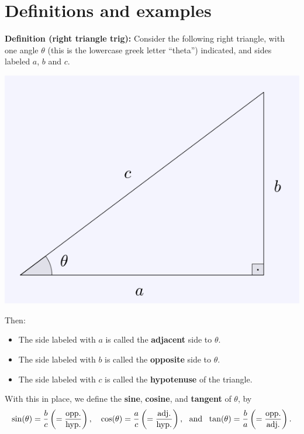 \documentclass{ximera}
\begin{document}
\section{Definitions and examples}

\begin{callout}
  {\bf Definition (right triangle trig):} Consider the following right triangle, with one angle $\theta$ (this is the lowercase greek letter ``theta'') indicated, and sides labeled $a$, $b$ and $c$.

\begin{center}
  \includegraphics[scale=.3]{./figures/9-1-1-defn.png}
\end{center}
  
  Then:
  \begin{itemize}
  \item   The side labeled with $a$ is called the {\bf adjacent} side to $\theta$.
  \item The side labeled with $b$ is called the {\bf opposite} side to $\theta$.
  \item   The side labeled with $c$ is called the {\bf hypotenuse} of the triangle.
  \end{itemize}
  With this in place, we define the {\bf sine}, {\bf cosine}, and {\bf tangent} of $\theta$, by $$\sin(\theta) = \frac{b}{c} \left(= \frac{\rm opp.}{\rm hyp.}\right), \quad \cos(\theta) = \frac{a}{c}\left(=\frac{\rm adj.}{\rm hyp.}\right), ~~\mbox{and}~~ \tan(\theta) = \frac{b}{a} \left(= \frac{\rm opp.}{\rm adj.}\right).$$
\end{callout}
\end{document}
